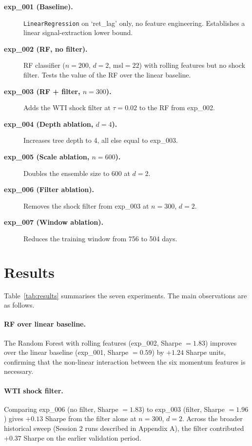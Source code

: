 \documentclass{article}
\begin{document}
\begin{description}
  \item[\textbf{exp\_001 (Baseline).}]
    \texttt{LinearRegression} on `ret\_lag' only, no feature engineering. Establishes
    a linear signal-extraction lower bound.
  \item[\textbf{exp\_002 (RF, no filter).}]
    RF classifier ($n=200$, $d=2$, msl$=22$) with rolling features but no shock filter.
    Tests the value of the RF over the linear baseline.
  \item[\textbf{exp\_003 (RF + filter, $n=300$).}]
    Adds the WTI shock filter at $\tau=0.02$ to the RF from exp\_002.
  \item[\textbf{exp\_004 (Depth ablation, $d=4$).}]
    Increases tree depth to 4, all else equal to exp\_003.
  \item[\textbf{exp\_005 (Scale ablation, $n=600$).}]
    Doubles the ensemble size to 600 at $d=2$.
  \item[\textbf{exp\_006 (Filter ablation).}]
    Removes the shock filter from exp\_003 at $n=300$, $d=2$.
  \item[\textbf{exp\_007 (Window ablation).}]
    Reduces the training window from 756 to 504 days.
\end{description}

\section{Results}



Table~\ref{tab:results} summarises the seven experiments.
The main observations are as follows.

\paragraph{RF over linear baseline.}
The Random Forest with rolling features (exp\_002, Sharpe $= 1.83$) improves over
the linear baseline (exp\_001, Sharpe $= 0.59$) by $+1.24$ Sharpe units, confirming
that the non-linear interaction between the six momentum features is necessary.

\paragraph{WTI shock filter.}
Comparing exp\_006 (no filter, Sharpe $= 1.83$) to exp\_003 (filter, Sharpe $= 1.96$)
gives $+0.13$ Sharpe from the filter alone at $n=300$, $d=2$.
Across the broader historical sweep (Session 2 runs described in Appendix A),
the filter contributed $+0.37$ Sharpe on the earlier validation period.
\end{document}
